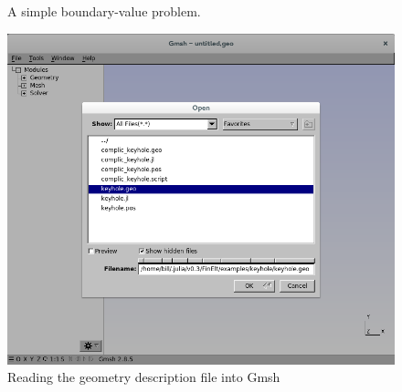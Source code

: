 \documentclass[a4paper,12pt]{article}
\begin{document}
\begin{figure}
\caption{A simple boundary-value problem.}
\label{fig: simple bvp}
\begin{center}
\end{center}
\end{figure}
\begin{figure}
\caption{Reading the geometry description file into Gmsh}
\label{fig: open file}
\begin{center}
\includegraphics[scale=0.3]{images/open_geo_file.png}
\end{center}
\end{figure}
\end{document}
